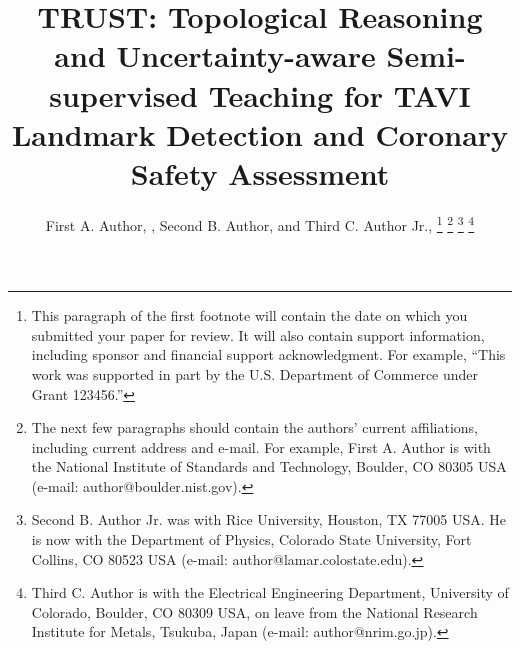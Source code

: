 \documentclass[conference]{IEEEtran}
\begin{document}
\title{TRUST: Topological Reasoning and Uncertainty-aware Semi-supervised Teaching for TAVI Landmark Detection and Coronary Safety Assessment}
\author{First A. Author, , Second B. Author, and Third C. Author Jr., 
\thanks{This paragraph of the first footnote will contain the date on
which you submitted your paper for review. It will also contain support
information, including sponsor and financial support acknowledgment. For
example, ``This work was supported in part by the U.S. Department of
Commerce under Grant 123456.'' }
\thanks{The next few paragraphs should contain
the authors' current affiliations, including current address and e-mail. For
example, First A. Author is with the National Institute of Standards and
Technology, Boulder, CO 80305 USA (e-mail: author@boulder.nist.gov). }
\thanks{Second B. Author Jr. was with Rice University, Houston, TX 77005 USA. He is
now with the Department of Physics, Colorado State University, Fort Collins,
CO 80523 USA (e-mail: author@lamar.colostate.edu).}
\thanks{Third C. Author is with
the Electrical Engineering Department, University of Colorado, Boulder, CO
80309 USA, on leave from the National Research Institute for Metals,
Tsukuba, Japan (e-mail: author@nrim.go.jp).}}

\maketitle
\end{document}

